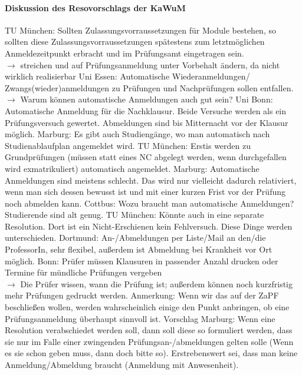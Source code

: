     \paragraph{Diskussion des Resovorschlags der KaWuM}
      \begin{outline}
        \1 TU München: \glqq Sollten Zulassungsvorraussetzungen für Module bestehen, so sollten diese Zulassungsvorraussetzungen spätestens zum letztmöglichen Anmeldezeitpunkt erbracht und im Prüfungsamt eingetragen sein.\grqq \\
          $\rightarrow$ streichen und auf Prüfungsanmeldung unter Vorbehalt ändern, da nicht wirklich realisierbar
        \1 Uni Essen: \glqq Automatische Wiederanmeldungen/ Zwangs\-(wieder)\-anmeldungen zu Prüfungen und Nachprüfungen sollen entfallen.\grqq \\
          $\rightarrow$ Warum können automatische Anmeldungen auch gut sein?
          \2 Uni Bonn: Automatische Anmeldung für die Nachklausur. Beide Versuche werden als ein Prüfungsversuch gewertet. Abmeldungen sind bis Mitternacht vor der Klausur möglich.
          \2 Marburg: Es gibt auch Studiengänge, wo man automatisch nach Studienablaufplan angemeldet wird.
          \2 TU München: Erstis werden zu Grundprüfungen (müssen statt eines NC abgelegt werden, wenn durchgefallen wird exmatrikuliert) automatisch angemeldet.
          \2 Marburg: Automatische Anmeldungen sind meistens schlecht. Das wird nur vielleicht dadurch relativiert, wenn man sich dessen bewusst ist und mit einer kurzen Frist vor der Prüfung noch abmelden kann.
          \2 Cottbus: Wozu braucht man automatische Anmeldungen? Studierende sind alt genug.
          \2 TU München: Könnte auch in eine separate Resolution. Dort ist ein Nicht-Erschienen kein Fehlversuch. Diese Dinge werden unterschieden.
          \2 Dortmund: An-/Abmeldungen per Liste/Mail an den/die ProfessorIn, sehr flexibel, außerdem ist Abmeldung bei Krankheit vor Ort möglich.
        \1 Bonn: \glqq Prüfer müssen Klausuren in passender Anzahl drucken oder Termine für mündliche Prüfungen vergeben\grqq \\
          $\rightarrow$ Die Prüfer wissen, wann die Prüfung ist; außerdem können noch kurzfristig mehr Prüfungen gedruckt werden.
        \1 Anmerkung: Wenn wir das auf der ZaPF beschließen wollen, werden wahrscheinlich einige den Punkt anbringen, ob eine Prüfungsanmeldung überhaupt sinnvoll ist.
        \1 Vorschlag Marburg: Wenn eine Resolution verabschiedet werden soll, dann soll diese so formuliert werden, dass sie nur im Falle einer zwingenden Prüfungsan-/abmeldungen gelten solle (\glqq Wenn es sie schon geben muss, dann doch bitte so\grqq). Erstrebenswert sei, dass man keine Anmeldung/Abmeldung braucht (\glqq Anmeldung mit Anwesenheit\grqq).

\end{outline}
